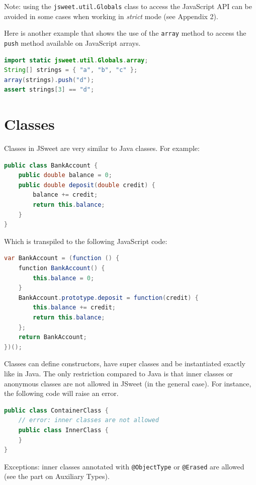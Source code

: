 \documentclass[a4paper]{report}
\begin{document}
Note: using the \texttt{jsweet.util.Globals} class to access the JavaScript API can be avoided in some cases when working in \emph{strict} mode (see Appendix 2).

\noindent
Here is another example that shows the use of the \texttt{array} method to access the \texttt{push} method available on JavaScript arrays.

\begin{lstlisting}[language=Java]
import static jsweet.util.Globals.array;
String[] strings = { "a", "b", "c" };
array(strings).push("d");
assert strings[3] == "d";
\end{lstlisting}

\section{Classes}

Classes in JSweet are very similar to Java classes. For example:

\begin{lstlisting}[language=Java]
public class BankAccount {  
    public double balance = 0;  
    public double deposit(double credit) {  
        balance += credit;  
        return this.balance;  
    }  
}  
\end{lstlisting}

\noindent
Which is transpiled to the following JavaScript code:

\begin{lstlisting}[language=Java]
var BankAccount = (function () {  
    function BankAccount() {  
        this.balance = 0;  
    }  
    BankAccount.prototype.deposit = function(credit) {  
        this.balance += credit;  
        return this.balance;  
    };  
    return BankAccount;  
})();
\end{lstlisting}

Classes can define constructors, have super classes and be instantiated exactly like in Java. The only restriction compared to Java is that inner classes or anonymous classes are not allowed in JSweet (in the general case). For instance, the following code will raise an error.

\begin{lstlisting}[language=Java]
public class ContainerClass {
	// error: inner classes are not allowed
	public class InnerClass {
	}
}
\end{lstlisting}

Exceptions: inner classes annotated with \texttt{@ObjectType} or \texttt{@Erased} are allowed (see the part on Auxiliary Types).
\end{document}
